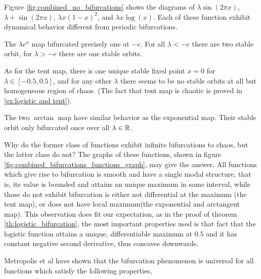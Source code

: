 Figure \ref{fig:combined_no_bifurcations} shows the diagrams of $\lambda \sin(2\pi x)$, $\lambda + \sin(2\pi x)$, $\lambda x(1-x)^2$, and $\lambda x \log(x)$. 
Each of these function exhibit dynamical behavior different from periodic bifurcations.

The $\lambda e^x$ map bifurcated precisely one at $-e$. 
For all $\lambda < -e$ there are two stable orbit, for $\lambda > -e$ there are one stable orbits.

As for the tent map, there is one unique stable fixed point $x=0$ for $\lambda \in [-0.5, 0.5]$, and for any other $\lambda$ there seems to be no stable orbits at all but homogeneous region of chaos. 
(The fact that tent map is chaotic is proved in \ref{ex:logistic and tent}).

The two $\arctan$ map have similar behavior as the exponential map. 
Their stable orbit only bifurcated once over all $\lambda \in \mathbb{R}$.

Why do the former class of functions exhibit infinite bifurcations to chaos, but the latter class do not?
The graphs of these functions, shown in figure \ref{fig:combined_bifurcations_functions_graph}, may give the answer. 
All functions which give rise to bifurcation is smooth and have a single modal structure, that is, its value is bounded and attains an unique maximum in some interval, while those do not exhibit bifurcation is either not differential at the maximum (the tent map), or does not have local maximum(the exponential and arctangent map).
This observation does fit our expectation, as in the proof of theorem \ref{th:logistic_bifurcation}, the most important properties used is that fact that the logistic function attains a unique, differentiable maximum at $0.5$ and it has constant negative second derivative, thus concaves downwards. 

Metropolis et al \cite{metropolis2017finite} have shown that the bifurcation phenomenon is universal for all functions which satisfy the following properties, 

